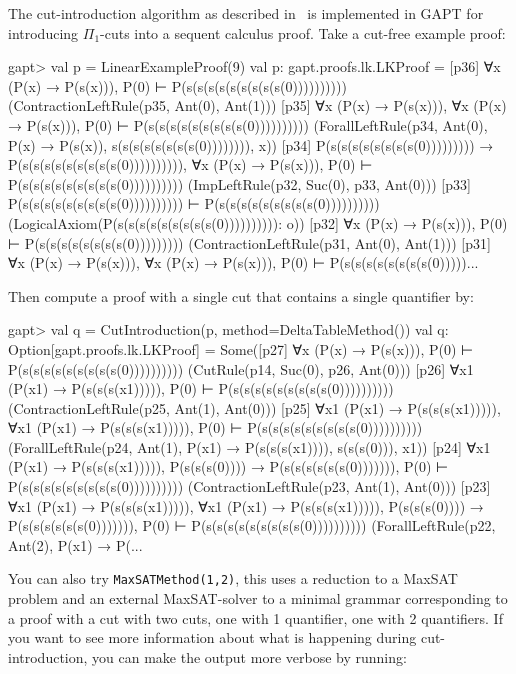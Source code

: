 \documentclass[a4paper,11pt]{book}
\begin{document}
The cut-introduction algorithm as described in~\cite{Hetzl2012,Hetzl14Algorithmic,Hetzl14Introducing} is
implemented in GAPT for introducing $\Pi_1$-cuts into a sequent calculus
proof. Take a cut-free example proof:
\begin{clilisting}
gapt> val p = LinearExampleProof(9)
val p: gapt.proofs.lk.LKProof =
[p36] ∀x (P(x) → P(s(x))), P(0) ⊢ P(s(s(s(s(s(s(s(s(s(0))))))))))    (ContractionLeftRule(p35, Ant(0), Ant(1)))
[p35] ∀x (P(x) → P(s(x))), ∀x (P(x) → P(s(x))), P(0) ⊢ P(s(s(s(s(s(s(s(s(s(0))))))))))    (ForallLeftRule(p34, Ant(0), P(x) → P(s(x)), s(s(s(s(s(s(s(s(0)))))))), x))
[p34] P(s(s(s(s(s(s(s(s(0))))))))) → P(s(s(s(s(s(s(s(s(s(0)))))))))),
∀x (P(x) → P(s(x))),
P(0)
⊢
P(s(s(s(s(s(s(s(s(s(0))))))))))    (ImpLeftRule(p32, Suc(0), p33, Ant(0)))
[p33] P(s(s(s(s(s(s(s(s(s(0)))))))))) ⊢ P(s(s(s(s(s(s(s(s(s(0))))))))))    (LogicalAxiom(P(s(s(s(s(s(s(s(s(s(0)))))))))): o))
[p32] ∀x (P(x) → P(s(x))), P(0) ⊢ P(s(s(s(s(s(s(s(s(0)))))))))    (ContractionLeftRule(p31, Ant(0), Ant(1)))
[p31] ∀x (P(x) → P(s(x))), ∀x (P(x) → P(s(x))), P(0) ⊢ P(s(s(s(s(s(s(s(s(0)))))...

\end{clilisting}
Then compute a proof with a single cut that contains a single quantifier by:
\begin{clilisting}
gapt> val q = CutIntroduction(p, method=DeltaTableMethod())
val q: Option[gapt.proofs.lk.LKProof] =
Some([p27] ∀x (P(x) → P(s(x))), P(0) ⊢ P(s(s(s(s(s(s(s(s(s(0))))))))))    (CutRule(p14, Suc(0), p26, Ant(0)))
[p26] ∀x1 (P(x1) → P(s(s(s(x1))))), P(0) ⊢ P(s(s(s(s(s(s(s(s(s(0))))))))))    (ContractionLeftRule(p25, Ant(1), Ant(0)))
[p25] ∀x1 (P(x1) → P(s(s(s(x1))))),
∀x1 (P(x1) → P(s(s(s(x1))))),
P(0)
⊢
P(s(s(s(s(s(s(s(s(s(0))))))))))    (ForallLeftRule(p24, Ant(1), P(x1) → P(s(s(s(x1)))), s(s(s(0))), x1))
[p24] ∀x1 (P(x1) → P(s(s(s(x1))))),
P(s(s(s(0)))) → P(s(s(s(s(s(s(0))))))),
P(0)
⊢
P(s(s(s(s(s(s(s(s(s(0))))))))))    (ContractionLeftRule(p23, Ant(1), Ant(0)))
[p23] ∀x1 (P(x1) → P(s(s(s(x1))))),
∀x1 (P(x1) → P(s(s(s(x1))))),
P(s(s(s(0)))) → P(s(s(s(s(s(s(0))))))),
P(0)
⊢
P(s(s(s(s(s(s(s(s(s(0))))))))))    (ForallLeftRule(p22, Ant(2), P(x1) → P(...

\end{clilisting}

You can also try \texttt{MaxSATMethod(1,2)}, this uses a reduction to a MaxSAT
problem and an external MaxSAT-solver to a
minimal grammar corresponding to a proof with a cut with two cuts, one with 1
quantifier, one with 2 quantifiers.  If you want to see more information
about what is happening during cut-introduction, you can make the output more
verbose by running:
\end{document}
